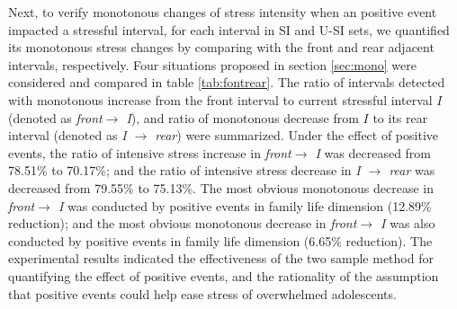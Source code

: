 Next,
to verify monotonous changes of stress intensity when an positive event impacted a stressful interval,
for each interval in SI and U-SI sets,
we quantified its monotonous stress changes by comparing with the front and rear adjacent intervals, respectively.
Four situations proposed in section \ref{sec:mono} were considered and compared in table \ref{tab:fontrear}.
The ratio of intervals detected with monotonous increase from the front interval to current stressful interval $I$ (denoted as \emph{front$ \rightarrow$ I}),
and ratio of monotonous decrease from $I$ to its rear interval (denoted as \emph{I $\rightarrow$ rear}) were summarized.
Under the effect of positive events,
the ratio of intensive stress increase in \emph{front$ \rightarrow$ I} was decreased from 78.51\% to 70.17\%;
and the ratio of intensive stress decrease in \emph{I $\rightarrow$ rear} was decreased from 79.55\% to 75.13\%.
The most obvious monotonous decrease in \emph{front$ \rightarrow$ I} was conducted by positive events in family life dimension (12.89\% reduction);
and the most obvious monotonous decrease in \emph{front$ \rightarrow$ I} was also conducted by positive events in family life dimension (6.65\% reduction).
The experimental results indicated the effectiveness of the two sample method for quantifying the effect of positive events,
and the rationality of the assumption that positive events could help ease stress of overwhelmed adolescents.


